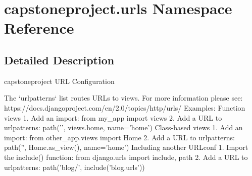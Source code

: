 \hypertarget{namespacecapstoneproject_1_1urls}{}\section{capstoneproject.\+urls Namespace Reference}
\label{namespacecapstoneproject_1_1urls}


\subsection{Detailed Description}
\begin{DoxyVerb}capstoneproject URL Configuration

The `urlpatterns` list routes URLs to views. For more information please see:
    https://docs.djangoproject.com/en/2.0/topics/http/urls/
Examples:
Function views
    1. Add an import:  from my_app import views
    2. Add a URL to urlpatterns:  path('', views.home, name='home')
Class-based views
    1. Add an import:  from other_app.views import Home
    2. Add a URL to urlpatterns:  path('', Home.as_view(), name='home')
Including another URLconf
    1. Import the include() function: from django.urls import include, path
    2. Add a URL to urlpatterns:  path('blog/', include('blog.urls'))
\end{DoxyVerb}
 